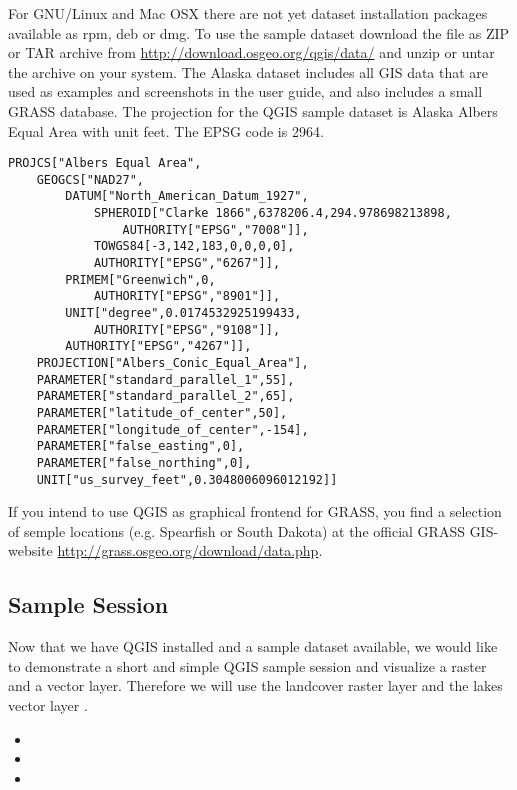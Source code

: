 \nix \osx For GNU/Linux and Mac OSX there are not yet dataset installation
packages available as rpm, deb or dmg. To use the sample dataset download the
file  as ZIP or TAR archive from
\url{http://download.osgeo.org/qgis/data/} and unzip or untar the archive on
your system. The Alaska dataset includes all GIS data that are used as
examples and screenshots in the user guide, and also includes a small GRASS
database. The projection for the QGIS sample dataset is Alaska Albers Equal
Area with unit feet. The EPSG code is 2964.

\begin{verbatim}
PROJCS["Albers Equal Area",
    GEOGCS["NAD27",
        DATUM["North_American_Datum_1927",
            SPHEROID["Clarke 1866",6378206.4,294.978698213898,
                AUTHORITY["EPSG","7008"]],
            TOWGS84[-3,142,183,0,0,0,0],
            AUTHORITY["EPSG","6267"]],
        PRIMEM["Greenwich",0,
            AUTHORITY["EPSG","8901"]],
        UNIT["degree",0.0174532925199433,
            AUTHORITY["EPSG","9108"]],
        AUTHORITY["EPSG","4267"]],
    PROJECTION["Albers_Conic_Equal_Area"],
    PARAMETER["standard_parallel_1",55],
    PARAMETER["standard_parallel_2",65],
    PARAMETER["latitude_of_center",50],
    PARAMETER["longitude_of_center",-154],
    PARAMETER["false_easting",0],
    PARAMETER["false_northing",0],
    UNIT["us_survey_feet",0.3048006096012192]]
\end{verbatim}

If you intend to use QGIS as graphical frontend for GRASS, you find a
selection of semple locations (e.g. Spearfish or South Dakota) at the
official GRASS GIS-website \url{http://grass.osgeo.org/download/data.php}. 

\subsection{Sample Session}\label{samplesession}

Now that we have QGIS installed and a sample dataset available, we would 
like to demonstrate a short and simple QGIS sample session and visualize 
a raster and a vector layer. Therefore we will use the landcover raster 
layer  and the lakes 
vector layer .


\begin{itemize}
\item {} 
\item {}
\item {}
\end{itemize} 

